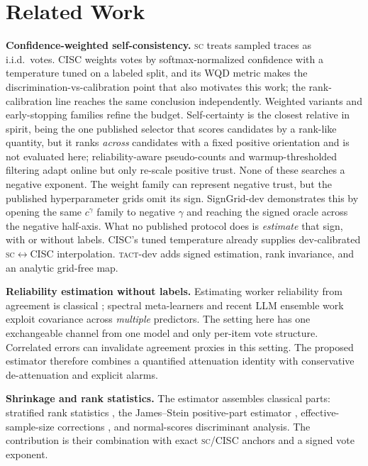 \documentclass[conference]{IEEEtran}
\newcommand{\SC}{\textsc{sc}}
\newcommand{\TACT}{\textsc{tact}}
\begin{document}
\section{Related Work}\label{sec:related}

\textbf{Confidence-weighted self-consistency.} \SC{} \cite{wang2023selfconsistency} treats sampled traces as i.i.d.\ votes. CISC \cite{taubenfeld2025cisc} weights votes by softmax-normalized confidence with a temperature tuned on a labeled split, and its WQD metric makes the discrimination-vs-calibration point that also motivates this work; the rank-calibration line \cite{huang2024rankcalibration} reaches the same conclusion independently. Weighted variants \cite{li2023diverse} and early-stopping families
\cite{aggarwal2023adaptive,li2024escape} refine the budget. Self-certainty
\cite{borda2025} is the closest relative in spirit, being the one published
selector that scores candidates by a rank-like quantity, but it ranks \emph{across} candidates with a fixed positive
orientation and is not evaluated here; reliability-aware pseudo-counts \cite{reasc2026} and warmup-thresholded filtering \cite{deepconf2025} adapt online but only re-scale positive trust. None of these searches a negative exponent. The
weight family can represent negative trust, but the published hyperparameter
grids omit its sign. SignGrid-dev demonstrates this by opening the same $c^{\gamma}$ family to
negative $\gamma$ and reaching the signed oracle across the negative half-axis.
What no published protocol does is \emph{estimate} that sign, with or without
labels. CISC's tuned temperature already supplies dev-calibrated
\SC$\leftrightarrow$CISC interpolation. \TACT-dev adds signed estimation, rank
invariance, and an analytic grid-free map.

\textbf{Reliability estimation without labels.} Estimating worker reliability from agreement is classical \cite{dawid1979maximum,whitehill2009whose,karger2011iterative}; spectral meta-learners \cite{parisi2014ranking} and recent LLM ensemble work \cite{fuse2026,beyondmajority2025} exploit covariance across \emph{multiple} predictors. The setting here has one exchangeable channel from one model and only per-item vote structure. Correlated errors can invalidate agreement proxies in this setting. The proposed estimator therefore combines a quantified attenuation identity with conservative de-attenuation and explicit alarms.

\textbf{Shrinkage and rank statistics.} The estimator assembles classical parts: stratified rank statistics \cite{vanelteren1960}, the James--Stein positive-part estimator \cite{james1961estimation}, effective-sample-size corrections \cite{kish1965,rao1981analysis}, and normal-scores discriminant analysis. The contribution is their combination with exact \SC{}/CISC anchors and a signed vote exponent.
\end{document}
